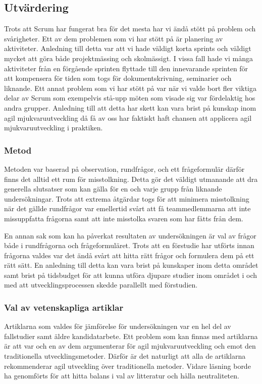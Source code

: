 \subsection{Utvärdering}
Trots att Scrum har fungerat bra för det mesta har vi ändå stött på problem och svårigheter. Ett av dem problemen som vi har stött på är planering av aktiviteter. Anledning till detta var att vi hade väldigt korta sprints och väldigt mycket att göra både projektmässing och skolmässigt. I vissa fall hade vi många aktiviteter från en förgående sprinten flyttade till den innevarande sprinten för att kompensera för tiden som togs för dokumentskrivning, seminarier och liknande. Ett annat problem som vi har stött på var när vi valde bort fler viktiga delar av Scrum som exempelvis stå-upp möten som visade sig var fördelaktig hos andra grupper. Anledning till att detta har skett kan vara brist på kunskap inom agil mjukvaruutveckling då få av oss har faktiskt haft chansen att applicera agil mjukvaruutveckling i praktiken. 

\subsubsection{Metod}
Metoden var baserad på observation, rundfrågor, och ett frågeformulär därför finns det alltid ett rum för misstolkning. Detta gör det väldigt utmanande att dra generella slutsatser som kan gälla för en och varje grupp från liknande undersökningar. Trots att extrema åtgärdar togs för att minimera misstolkning när det gällde rundfrågor var emellertid svårt att få teammedlemmarna att inte missuppfatta frågorna samt att inte misstolka svaren som har fåtts från dem. 

En annan sak som kan ha påverkat resultaten av undersökningen är val av frågor både i rundfrågorna och frågeformuläret. Trots att en förstudie har utförts innan frågorna valdes var det ändå svårt att hitta rätt frågor och formulera dem på ett rätt sätt. En anledning till detta kan vara brist på kunskaper inom detta området samt brist på tidsbudget för att kunna utföra djupare studier inom området i och med att utvecklingsprocessen skedde parallellt med förstudien. 

\subsubsection{Val av vetenskapliga artiklar}
Artiklarna som valdes för jämförelse för undersökningen var en hel del av fallstudier samt äldre kandidatarbete. Ett problem som kan finnas med artiklarna är att var och en av dem argumenterar för agil mjukvaruutveckling och emot den traditionella utvecklingsmetoder. Därför är det naturligt att alla de artiklarna rekommenderar agil utveckling över traditionella metoder. Vidare läsning borde ha genomförts för att hitta balans i val av litteratur och hålla neutraliteten.
